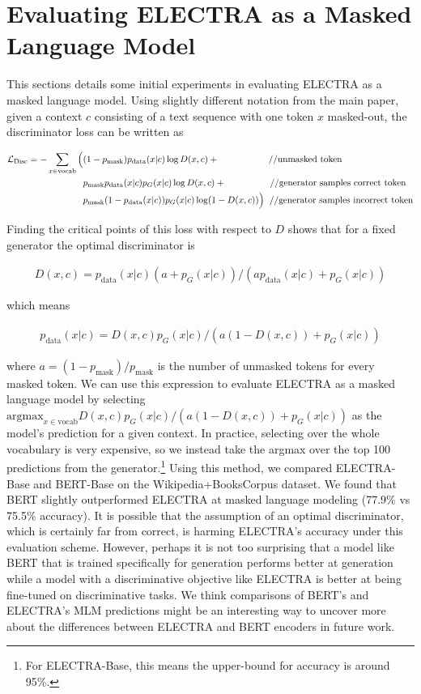 \documentclass{article}
\newcommand{\alns}[1] {
	\begin{align*} #1 \end{align*}
}
\newcommand{\pdata}{p_{\text{data}}}
\newcommand{\pmask}{p_{\text{mask}}}
\newcommand{\lossds}{\mathcal{L}_\text{Disc}}
\begin{document}
\section{Evaluating ELECTRA as a Masked Language Model}
This sections details some initial experiments in evaluating ELECTRA as a masked language model. 
Using slightly different notation from the main paper, given a context $c$ consisting of a text sequence with one token $x$ masked-out, the discriminator loss can be written as
\alns{
    \lossds = -\sum\limits_{x\in\text{vocab}} \Big( &(1 - \pmask) \pdata(x|c)\log D(x, c) + \text{\hspace{19mm}//unmasked token}\\
    &\pmask\pdata(x|c)p_G(x|c)\log D(x, c) + \text{\hspace{17mm}//generator samples correct token}\\
    &\pmask(1 - \pdata(x|c))p_G(x|c)\log(1 - D(x, c))\Big) \text{\hspace{2mm}//generator samples incorrect token} \\
}
Finding the critical points of this loss with respect to $D$ shows that for a fixed generator the optimal discriminator is
\alns{
    D(x, c) = \pdata(x|c)(a + p_G(x|c))/(a\pdata(x|c) + p_G(x|c))
}
which means
\alns{
    \pdata(x|c) = D(x, c)p_G(x|c) / (a(1 - D(x, c)) + p_G(x|c))
}
where $a = (1 - \pmask)/\pmask$ is the number of unmasked tokens for every masked token.
We can use this expression to evaluate ELECTRA as a masked language model by selecting $\text{argmax}_{x\in\text{vocab}} D(x, c)p_G(x|c) / (a(1 - D(x, c)) + p_G(x|c))$ as the model's prediction for a given context.
In practice, selecting over the whole vocabulary is very expensive, so we instead take the argmax over the top 100 predictions from the generator.\footnote{For ELECTRA-Base, this means the upper-bound for accuracy is around 95\%.}
Using this method, we compared ELECTRA-Base and BERT-Base on the Wikipedia+BooksCorpus dataset.
We found that BERT slightly outperformed ELECTRA at masked language modeling (77.9\% vs 75.5\% accuracy).
It is possible that the assumption of an optimal discriminator, which is certainly far from correct, is harming ELECTRA's accuracy under this evaluation scheme.
However, perhaps it is not too surprising that a model like BERT that is trained specifically for generation performs better at generation while a model with a discriminative objective like ELECTRA is better at being fine-tuned on discriminative tasks. 
We think comparisons of BERT's and ELECTRA's MLM predictions might be an interesting way to uncover more about the differences between ELECTRA and BERT encoders in future work.
\end{document}
